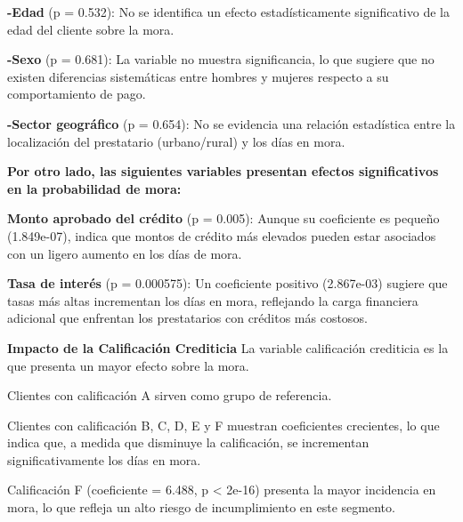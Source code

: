 \documentclass[Royal,times,sageh]{sagej}
\begin{document}
\textbf{-Edad} (p = 0.532): No se identifica un efecto estadísticamente
significativo de la edad del cliente sobre la mora.

\textbf{-Sexo} (p = 0.681): La variable no muestra significancia, lo que
sugiere que no existen diferencias sistemáticas entre hombres y mujeres
respecto a su comportamiento de pago.

\textbf{-Sector geográfico} (p = 0.654): No se evidencia una relación
estadística entre la localización del prestatario (urbano/rural) y los
días en mora.

\textbf{Por otro lado, las siguientes variables presentan efectos
significativos en la probabilidad de mora:}

\textbf{Monto aprobado del crédito} (p = 0.005): Aunque su coeficiente
es pequeño (1.849e-07), indica que montos de crédito más elevados pueden
estar asociados con un ligero aumento en los días de mora.

\textbf{Tasa de interés} (p = 0.000575): Un coeficiente positivo
(2.867e-03) sugiere que tasas más altas incrementan los días en mora,
reflejando la carga financiera adicional que enfrentan los prestatarios
con créditos más costosos.

\textbf{Impacto de la Calificación Crediticia} La variable calificación
crediticia es la que presenta un mayor efecto sobre la mora.

Clientes con calificación A sirven como grupo de referencia.

Clientes con calificación B, C, D, E y F muestran coeficientes
crecientes, lo que indica que, a medida que disminuye la calificación,
se incrementan significativamente los días en mora.

Calificación F (coeficiente = 6.488, p \textless{} 2e-16) presenta la
mayor incidencia en mora, lo que refleja un alto riesgo de
incumplimiento en este segmento.
\end{document}
